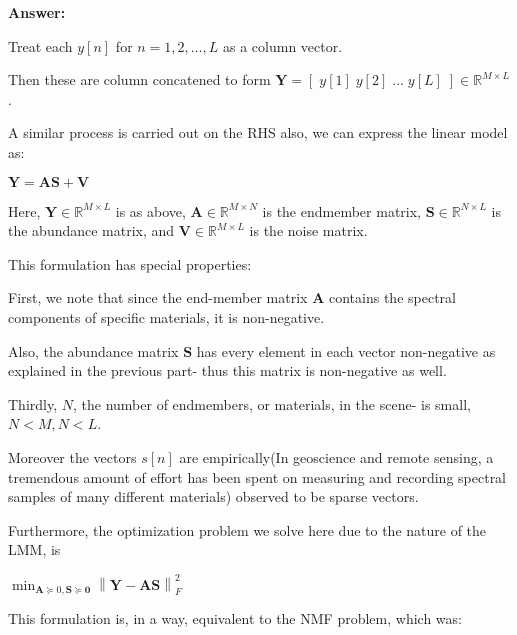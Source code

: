 \documentclass[fleqn, 11pt]{article}
\newcommand{\bs}[1]{\boldsymbol{#1}}
\newcommand\norm[1]{\left\lVert#1\right\rVert}
\newcommand{\R}[0]{\mathbb{R}}
\begin{document}
\textbf{Answer: }

\smallskip

Treat each $y[n]$ for $n= 1,2,\ldots, L$  as a column vector. 

\smallskip

Then these are column concatened to form 
$\bs{Y}=[ \; y[1] \; y[2] \; \ldots \; y[L] \; ] \in \R^{M \times L}$.

\smallskip

A similar process is carried out on the RHS also, we can express the linear model as:

\begin{center}
    $\bs{Y=AS+V}$
\end{center}

Here, $\bs{Y} \in \R^{M \times L} $ is as above, 
$\bs{A} \in \R^{M \times N}$ is the endmember matrix, 
$\bs{S} \in \R^{N \times L}$ is the abundance matrix,  and 
$\bs{V} \in \R^{M \times L}$ is the noise matrix. 

\medskip

This formulation has special properties: 

\smallskip

First, we note that since the end-member matrix $\bs{A}$ 
contains the spectral components of specific materials, it is non-negative. 

\smallskip

Also, the abundance matrix $\bs{S}$ has every element in each vector non-negative 
as explained in the previous part- thus this matrix is non-negative as well. 

\smallskip

Thirdly, $N$, the number of endmembers, or materials, in the scene- is small, $N < M, N<L$.

\smallskip

Moreover the vectors $s[n]$ are empirically(In geoscience and remote sensing,
a tremendous amount of effort has been spent on measuring
and recording spectral samples of many different materials) observed to be sparse vectors. 


\smallskip

Furthermore, the optimization problem we solve here due to the nature of the LMM, is 

\begin{center}
    $\displaystyle \min_{ \bs{A} \succeq {0}, \bs{S \succeq 0}  } \norm{\bs{Y-AS}}^2_F$
\end{center}

This formulation is, in a way,  equivalent to the NMF problem, which was:
\end{document}
